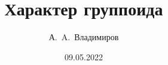 \documentclass[11pt]{article}
\theoremstyle{plain}
\theoremstyle{definition}
\theoremstyle{remark}
\begin{document}
\author{А.~A.~Владимиров}
\title{Характер группоида}
\date{09.05.2022}
\maketitle



\end{document}
